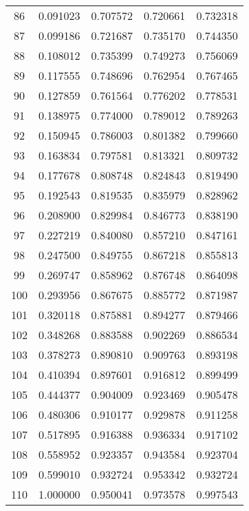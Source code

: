 \begin{center}
\begin{tabular}{|c|c|c|c|c|}
    86    & 0.091023   & 0.707572     & 0.720661     & 0.732318 \\ 
    87    & 0.099186   & 0.721687     & 0.735170     & 0.744350 \\ 
    88    & 0.108012   & 0.735399     & 0.749273     & 0.756069 \\ 
    89    & 0.117555   & 0.748696     & 0.762954     & 0.767465 \\ 
    90    & 0.127859   & 0.761564     & 0.776202     & 0.778531 \\ 
    91    & 0.138975   & 0.774000     & 0.789012     & 0.789263 \\ 
    92    & 0.150945   & 0.786003     & 0.801382     & 0.799660 \\ 
    93    & 0.163834   & 0.797581     & 0.813321     & 0.809732 \\ 
    94    & 0.177678   & 0.808748     & 0.824843     & 0.819490 \\ 
    95    & 0.192543   & 0.819535     & 0.835979     & 0.828962 \\ 
    96    & 0.208900   & 0.829984     & 0.846773     & 0.838190 \\ 
    97    & 0.227219   & 0.840080     & 0.857210     & 0.847161 \\ 
    98    & 0.247500   & 0.849755     & 0.867218     & 0.855813 \\ 
    99    & 0.269747   & 0.858962     & 0.876748     & 0.864098 \\ 
    100   & 0.293956   & 0.867675     & 0.885772     & 0.871987 \\ 
    101   & 0.320118   & 0.875881     & 0.894277     & 0.879466 \\ 
    102   & 0.348268   & 0.883588     & 0.902269     & 0.886534 \\ 
    103   & 0.378273   & 0.890810     & 0.909763     & 0.893198 \\ 
    104   & 0.410394   & 0.897601     & 0.916812     & 0.899499 \\ 
    105   & 0.444377   & 0.904009     & 0.923469     & 0.905478 \\ 
    106   & 0.480306   & 0.910177     & 0.929878     & 0.911258 \\ 
    107   & 0.517895   & 0.916388     & 0.936334     & 0.917102 \\ 
    108   & 0.558952   & 0.923357     & 0.943584     & 0.923704 \\ 
    109   & 0.599010   & 0.932724     & 0.953342     & 0.932724 \\ 
    110   & 1.000000   & 0.950041     & 0.973578     & 0.997543 \\
    \hline
\end{tabular}
\end{center}

